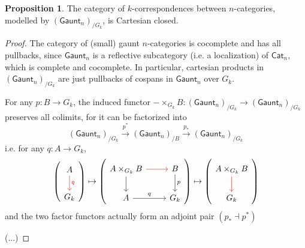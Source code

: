 \documentclass{article}
\theoremstyle{definition}
\newtheorem{prop}{Proposition}[section]
\theoremstyle{remark}
\begin{document}
\begin{prop}
The category of $k$-correspondences between $n$-categories, modelled by $(\mathsf{Gaunt}_n)_{/G_k}$, is Cartesian closed. 
\end{prop}

\begin{proof}
The category of (small) gaunt $n$-categories is cocomplete and has all pullbacks, since $\mathsf{Gaunt}_n$ is a reflective subcategory (i.e. a localization) of $\mathsf{Cat}_n$, which is complete and cocomplete. In particular, cartesian products in $(\mathsf{Gaunt}_n)_{/G_k}$ are just pullbacks of cospans in $\mathsf{Gaunt}_n$ over $G_k$. 

For any $p:B \to G_k$, the induced functor $- \times_{G_k} B:(\mathsf{Gaunt}_n)_{/G_k} \to (\mathsf{Gaunt}_n)_{/G_k}$ preserves all colimits, for it can be factorized into $$ (\mathsf{Gaunt}_n)_{/G_k} \xrightarrow{p^*} (\mathsf{Gaunt}_n)_{/B} \xrightarrow{p_*} (\mathsf{Gaunt}_n)_{/G_k}$$ i.e. for any $q:A \to G_k$, $$ \left( \begin{tikzcd} A \arrow[d,color=red,"q"] \\ G_k \end{tikzcd} \right) \mapsto \left( \begin{tikzcd} A \times_{G_k} B \arrow[d] \arrow[r,color=red] &  B \arrow[d,"p"] \\ A \arrow[r,"q"] & G_k \end{tikzcd} \right) \mapsto \left( \begin{tikzcd} A \times_{G_k} B \arrow[d,color=red] \\ G_k \end{tikzcd} \right)$$ and the two factor functors actually form an adjoint pair $(p_* \dashv p^*)$

(...)
\end{proof}
\end{document}
